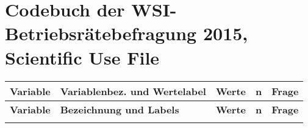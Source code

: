 
\section{Codebuch der WSI-Betriebsrätebefragung 2015, Scientific Use File}

\begin{longtable}{| L{2.5cm} | L{8.25cm} | C{1.5cm} | R{1.25cm} | C{2.25cm} |  }

\toprule
\textbf{Variable} & \textbf{Variablenbez. und Wertelabel} & \textbf{Werte} &  \textbf{n} & \textbf{Frage} \\ 
\midrule
\endfirsthead
\toprule
\textbf{Variable} & \textbf{Bezeichnung und Labels} & \textbf{Werte} & \textbf{n} & \textbf{Frage} \\ 
\midrule
\endhead

\midrule

\endfoot
\bottomrule
\endlastfoot



\end{longtable}
